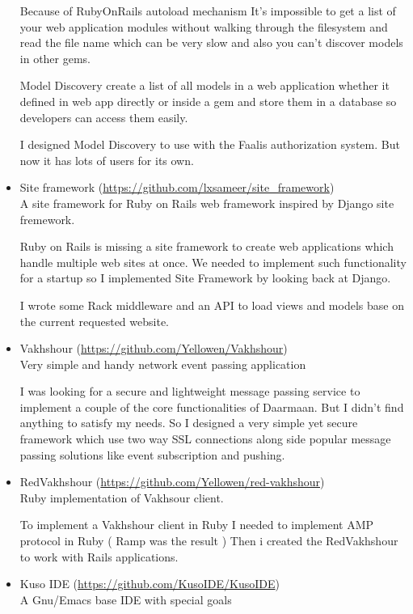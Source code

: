 \documentclass[a4paper,11pt]{article}
\begin{document}
\begin{itemize}
  Because of RubyOnRails autoload mechanism It's impossible to get a list
  of your web application modules without walking through the filesystem
  and read the file name which can be very slow and also you can't discover
  models in other gems.

  Model Discovery create a list of all models in a web application whether it
  defined in web app directly or inside a gem and store them in a database so
  developers can access them easily.

  I designed Model Discovery to use with the Faalis authorization system. But
  now it has lots of users for its own.

\item Site framework (\url{https://github.com/lxsameer/site_framework})\\
  A site framework for Ruby on Rails web framework inspired by
  Django site fremework.

  Ruby on Rails is missing a site framework to create web applications which handle
  multiple web sites at once. We needed to implement such functionality for a startup
  so I implemented Site Framework by looking back at Django.

  I wrote some Rack middleware and an API to load views and models base on the current
  requested website.

\item Vakhshour (\url{https://github.com/Yellowen/Vakhshour})\\
  Very simple and handy network event passing application

  I was looking for a secure and lightweight message passing service
  to implement a couple of the core functionalities of Daarmaan. But
  I didn't find anything to satisfy my needs. So I designed a very simple
  yet secure framework which use two way SSL connections along side popular
  message passing solutions like event subscription and pushing.

\item RedVakhshour (\url{https://github.com/Yellowen/red-vakhshour})\\
  Ruby implementation of Vakhsour client.

  To implement a Vakhshour client in Ruby I needed to implement AMP
  protocol in Ruby ( Ramp was the result ) Then i created the RedVakhshour
  to work with Rails applications.

\item Kuso IDE (\url{https://github.com/KusoIDE/KusoIDE})\\
  A Gnu/Emacs base IDE with special goals


\end{itemize}
\end{document}
